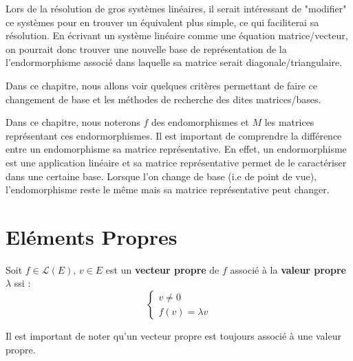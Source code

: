 


\minitoc  %

Lors de la résolution de gros systèmes linéaires, il serait intéressant de "modifier" ce systèmes pour en trouver un équivalent plus simple, 
ce qui faciliterai sa résolution. 
En écrivant un système linéaire comme une équation matrice/vecteur, on pourrait donc trouver une nouvelle base de représentation de 
la l'endormorphisme associé dans laquelle sa matrice serait diagonale/triangulaire. 

Dans ce chapitre, nous allons voir quelques critères permettant de faire ce changement de base et les méthodes de recherche des dites matrices/bases. 

\begin{remark}[Notation]
    Dans ce chapitre, nous noterons $f$ des endomorphismes et $M$ les matrices représentant ces endormorphismes. 
    Il est important de comprendre la différence entre un endomorphisme sa matrice représentative. 
    En effet, un endormorphisme est une application linéaire et sa matrice représentative permet de le caractériser dans une certaine base. 
    Lorsque l'on change de base (i.e de point de vue), l'endomorphisme reste le même mais sa matrice représentative peut changer. 
\end{remark}


\section{Eléments Propres}

\begin{definition}
    Soit $ f \in \mathcal{L}(E)$, $v \in E$ est un \textbf{vecteur propre} de $f$ associé à la \textbf{valeur propre} $\lambda$ ssi :
    \[ 
        \begin{cases}
            v \not = 0 \\
            f(v) = \lambda v
        \end{cases}
    \]
\end{definition}

Il est important de noter qu'un vecteur propre est toujours associé à une valeur propre. 

